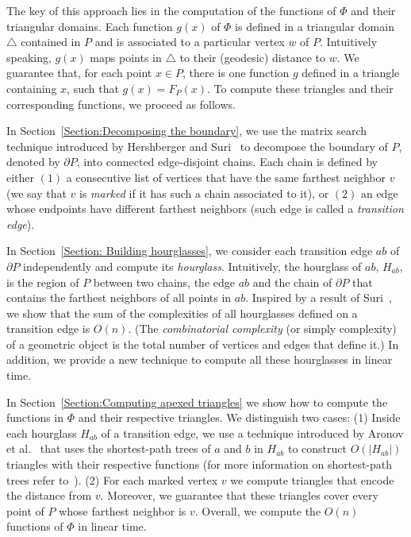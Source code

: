 \documentclass[a4paper,UKenglish]{lipics}
\newcommand{\F}[2]{\ensuremath{F_{\scriptscriptstyle #1}(#2)}}
\begin{document}
The key of this approach lies in the computation of the functions of $\Phi$ and their triangular domains. 
Each function $g(x)$ of $\Phi$ is defined in  a triangular domain $\triangle$ contained in $P$ and is associated to a particular vertex $w$ of $P$. 
Intuitively speaking, $g(x)$ maps points in $\triangle$ to their (geodesic) distance to $w$.
We guarantee that, for each point $x\in P$, there is one function $g$ defined in a triangle containing $x$, such that $g(x) = \F{P}{x}$.
To compute these triangles and their corresponding functions, we proceed as follows.

In Section~\ref{Section:Decomposing the boundary}, we use the matrix search technique introduced by Hershberger and Suri~\cite{hershberger1993matrix} to decompose the boundary of $P$, denoted by $\partial P$, into connected edge-disjoint chains.
Each chain is defined by either $(1)$ a consecutive list of vertices that have the same farthest neighbor $v$ (we say that $v$ is \emph{marked} if it has such a chain associated to it), or $(2)$ an edge whose endpoints have different farthest neighbors (such edge is called a \emph{transition edge}).

In Section~\ref{Section: Building hourglasses}, we consider each transition edge $ab$ of $\partial P$ independently and compute its \emph{hourglass}. Intuitively, the hourglass of $ab$, $H_{ab}$, is the region of $P$ between two chains, the edge $ab$ and the chain of $\partial P$ that contains the farthest neighbors of all points in $ab$.
Inspired by a result of Suri~\cite{suri1989computing}, we show that the sum of the complexities of all hourglasses defined on a transition edge is $O(n)$. (The \emph{combinatorial complexity} (or simply complexity) of a geometric object is the total number of vertices and edges that define it.)
In addition, we provide a new technique to compute all these hourglasses in linear time.

In Section~\ref{Section:Computing apexed triangles} we show how to compute the functions in $\Phi$ and their respective triangles.
We distinguish two cases: (1) Inside each hourglass $H_{ab}$ of a transition edge, we use a technique introduced by Aronov et al.~\cite{aronov1993furthest} that uses the shortest-path trees of $a$ and $b$ in $H_{ab}$ to construct $O(|H_{ab}|)$ triangles with their respective functions (for more information on shortest-path trees refer to~\cite{guibasShortestPathTree}). 
(2) For each marked vertex $v$ we compute triangles that encode the distance from $v$. Moreover, we guarantee that these triangles cover every point of $P$ whose farthest neighbor is $v$. 
Overall, we compute the $O(n)$ functions of $\Phi$ in linear time.
\end{document}
